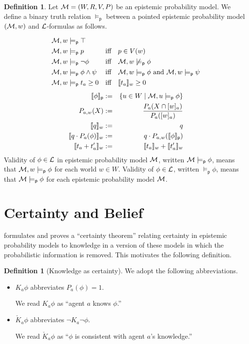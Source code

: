 \documentclass[12pt]{article}
\theoremstyle{definition}
\newtheorem{definition}[theorem]{Definition}
\newcommand{\M}{{\cal M}}      %
\newcommand{\Lang}{{\cal L}}   %
\newcommand{\sem}[1]{\llbracket{#1}\rrbracket}               %
\newcommand{\modelsp}{\models_{\mathsf{p}}}                  %
\newcommand{\semp}[1]{\llbracket{#1}\rrbracket_{\mathsf{p}}} %
\begin{document}
\begin{definition} 
  Let $\M=(W,R,V,P)$ be an epistemic probability model.  We define
  a binary truth relation $\modelsp$ between a pointed epistemic
  probability model $(\M,w)$ and $\Lang$-formulas as follows.
  \[
  \renewcommand{\arraystretch}{1.3}
  \begin{array}{lcl}
    \M,w\modelsp\top 
    \\
    \M,w\modelsp p & \text{iff} & 
    p \in V(w) 
    \\
    \M,w\modelsp\neg\phi & \text{iff} &
    \M,w\not\modelsp\phi
    \\
    \M,w\modelsp\phi\land\psi & \text{iff} &
    \M,w\modelsp\phi \text{ and } \M,w\modelsp\psi
    \\
    \M,w\modelsp t_a\geq 0 & \text{iff} &
    \sem{t_a}_w\geq 0
  \end{array}
  \]
  \begin{eqnarray*}
    \semp{\phi} & := &
    \{ u \in W\mid \M,u\modelsp\phi \}
    \\
    P_{a,w}(X) & := & 
    \displaystyle\frac{P_a(X\cap[w]_a)}{P_a([w]_a)}
    \\
    \sem{q}_w & := & q
    \\
    \sem{q\cdot P_a(\phi)}_w & := & 
    q\cdot P_{a,w}(\semp{\phi}) 
    \\
    \sem{t_a+t_a'}_w & := &
    \sem{t_a}_w + \sem{t_a'}_w
  \end{eqnarray*}
  Validity of $\phi\in\Lang$ in epistemic probability model $\M$,
  written $\M\modelsp\phi$, means that $\M,w\modelsp\phi$ for each
  world $w\in W$.  Validity of $\phi\in\Lang$, written $\modelsp\phi$,
  means that $\M\modelsp\phi$ for each epistemic probability model
  $\M$.
\end{definition} 

\section{Certainty and Belief} 
\label{Section:CB} 

\cite{Eijck2013:lap} formulates and proves a ``certainty theorem''
relating certainty in epistemic probability models to knowledge in a
version of these models in which the probabilistic information is
removed.  This motivates the following definition.

\begin{definition}[Knowledge as certainty]
  We adopt the following abbreviations.
  \begin{itemize}
  \item $K_a\phi$ abbreviates $P_a(\phi)=1$. 

    We read $K_a\phi$ as ``agent $a$ knows $\phi$.''

  \item $\check K_a\phi$ abbreviates $\lnot K_a\lnot\phi$.

    We read $\check K_a\phi$ as ``$\phi$ is consistent with agent
    $a$'s knowledge.''
  \end{itemize}
\end{definition}
\end{document}
